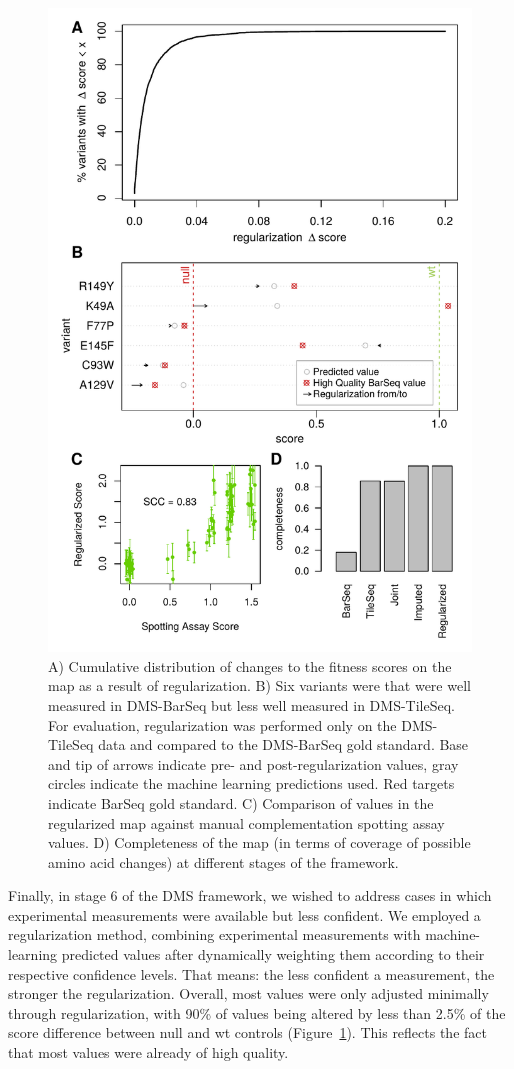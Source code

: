 \begin{figure}[h!]
	\centering
	\includegraphics[width=.7\textwidth]{img/regularization_eval_ube2i.pdf}
	\caption{A) Cumulative distribution of changes to the fitness scores on the map as a result of regularization. B) Six variants were that were well measured in DMS-BarSeq but less well measured in DMS-TileSeq. For evaluation, regularization was performed only on the DMS-TileSeq data and compared to the DMS-BarSeq gold standard. Base and tip of arrows indicate pre- and post-regularization values, gray circles indicate the machine learning predictions used. Red targets indicate BarSeq gold standard. C) Comparison of values in the regularized map against manual complementation spotting assay values. D) Completeness of the map (in terms of coverage of possible amino acid changes) at different stages of the framework.}
	\label{fig:regularization}
\end{figure}

Finally, in stage 6 of the DMS framework, we wished to address cases in which experimental measurements were available but less confident. We employed a regularization method, combining experimental measurements with machine-learning predicted values after dynamically weighting them according to their respective confidence levels. That means: the less confident a measurement, the stronger the regularization. Overall, most values were only adjusted minimally through regularization, with 90\% of values being altered by less than 2.5\% of the score difference between null and wt controls (Figure~\ref{fig:regularization}). This reflects the fact that most values were already of high quality. 

